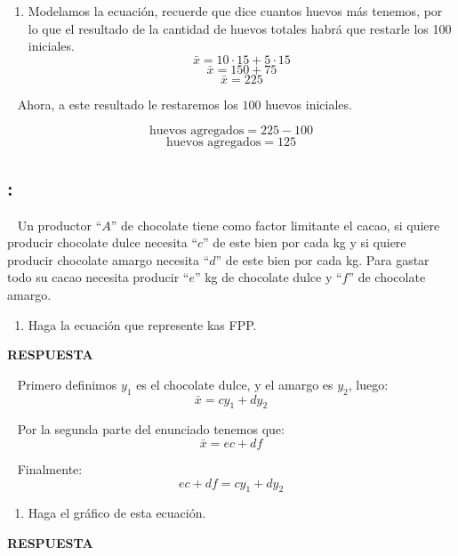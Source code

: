 \documentclass[
  letterpaper,
  DIV=11,
  numbers=noendperiod]{scrreport}
\providecommand{\tightlist}{%
  \setlength{\itemsep}{0pt}\setlength{\parskip}{0pt}}\usepackage{longtable,booktabs,array}
\begin{document}
\begin{enumerate}
\def\labelenumi{\arabic{enumi})}
\setcounter{enumi}{3}
\tightlist
\item
  Modelamos la ecuación, recuerde que dice cuantos huevos más tenemos,
  por lo que el resultado de la cantidad de huevos totales habrá que
  restarle los 100 iniciales. \[
  \bar x=10\cdot 15+ 5\cdot 15
  \] \[
  \bar x=150+ 75
  \] \[
  \bar x=225
  \]
\end{enumerate}

~ Ahora, a este resultado le restaremos los \(100\) huevos iniciales.

\[
\text{huevos agregados}=225-100
\] \[
\text{huevos agregados}=125
\]

\hypertarget{section-24}{%
\subsection{:}\label{section-24}}

~ Un productor ``\(A\)'' de chocolate tiene como factor limitante el
cacao, si quiere producir chocolate dulce necesita ``\(c\)'' de este
bien por cada kg y si quiere producir chocolate amargo necesita
``\(d\)'' de este bien por cada kg. Para gastar todo su cacao necesita
producir ``\(e\)'' kg de chocolate dulce y ``\(f\)'' de chocolate
amargo.

\begin{enumerate}
\def\labelenumi{\arabic{enumi})}
\tightlist
\item
  Haga la ecuación que represente kas FPP.
\end{enumerate}

\textbf{RESPUESTA}

~ Primero definimos \(y_1\) es el chocolate dulce, y el amargo es
\(y_2\), luego: \[
\bar{x}=cy_1+dy_2
\]

~ Por la segunda parte del enunciado tenemos que: \[
\bar{x}=ec+df
\]

~ Finalmente: \[
ec+df=cy_1+dy_2
\]

\begin{enumerate}
\def\labelenumi{\arabic{enumi})}
\setcounter{enumi}{1}
\tightlist
\item
  Haga el gráfico de esta ecuación.
\end{enumerate}

\textbf{RESPUESTA}
\end{document}
